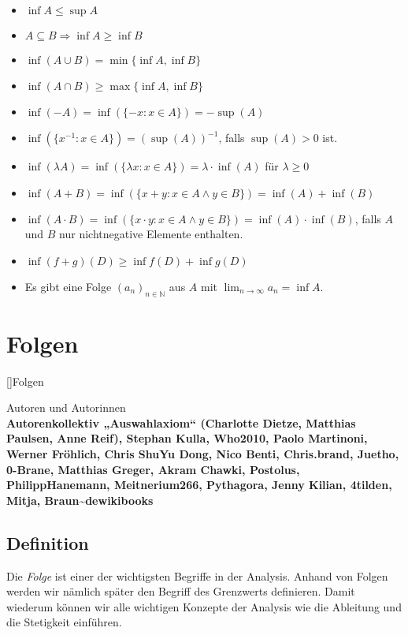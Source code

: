 \documentclass[fontsize=9pt,
               parskip=half-,
               DIV=14,
               listof=chapterentry,
               tocflat]{scrbook}
\newenvironment{authors}{\par\vspace*{\fill}\color{white}Autoren und
Autorinnen\\\bfseries}{\clearpage}
\begin{document}
\begin{itemize}
\item $\inf A\leq \sup A$
\item $A\subseteq B\Rightarrow \inf A\geq \inf B$
\item $\inf(A\cup B)=\min\{\inf A,\inf B\}$
\item $\inf(A\cap B)\geq \max\{\inf A,\inf B\}$
\item $\inf(-A)=\inf(\{-x:x\in A\})=-\sup(A)$
\item $\inf(\{x^{-1}:x\in A\})=(\sup(A))^{-1}$, falls $\sup(A)>0$ ist.
\item $\inf(\lambda A)=\inf(\{\lambda x:x\in A\})=\lambda \cdot \inf(A)$ für $\lambda \geq 0$
\item $\inf(A+B)=\inf(\{x+y:x\in A\land y\in B\})=\inf(A)+\inf(B)$
\item $\inf(A\cdot B)=\inf(\{x\cdot y:x\in A\land y\in B\})=\inf(A)\cdot \inf(B)$, falls $A$ und $B$ nur nichtnegative Elemente enthalten.
\item $\inf(f+g)(D)\geq \inf f(D)+\inf g(D)$
\item Es gibt eine Folge $(a_{n})_{n\in \mathbb {N} }$ aus $A$ mit $\lim _{n\rightarrow \infty }a_{n}=\inf A$.
\end{itemize}

\part{Folgen}

[]{Folgen}\begin{authors}
Autorenkollektiv „Auswahlaxiom“ (Charlotte Dietze, Matthias Paulsen, Anne Reif), Stephan Kulla, Who2010, Paolo Martinoni, Werner Fröhlich, Chris ShuYu Dong, Nico Benti, Chris.brand, Juetho, 0-Brane, Matthias Greger, Akram Chawki, Postolus, PhilippHanemann, Meitnerium266, Pythagora, Jenny Kilian, 4tilden, Mitja, Braun\textasciitilde{}dewikibooks\end{authors}

\chapter{Definition}

Die \emph{Folge} ist einer der wichtigsten Begriffe in der Analysis. Anhand von Folgen werden wir nämlich später den Begriff des Grenzwerts definieren. Damit wiederum können wir alle wichtigen Konzepte der Analysis wie die Ableitung und die Stetigkeit einführen.
\end{document}
